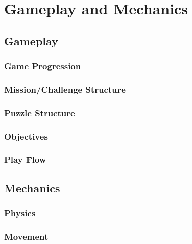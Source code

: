 \documentclass[12pt,titlepage]{article}
\begin{document}
\section{Gameplay and Mechanics}

\subsection{Gameplay}

\subsubsection{Game Progression}

\subsubsection{Mission/Challenge Structure}

\subsubsection{Puzzle Structure}

\subsubsection{Objectives}

\subsubsection{Play Flow}

\subsection{Mechanics}

\subsubsection{Physics}

\subsubsection{Movement}
\end{document}
